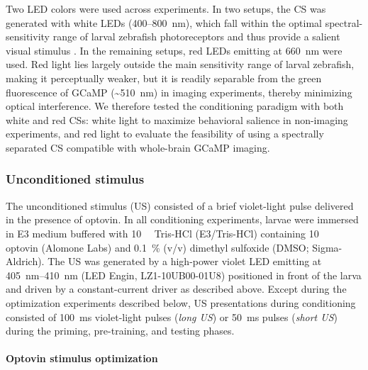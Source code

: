 Two LED colors were used across experiments. In two setups, the CS was generated with white LEDs (400--800~nm), which fall within the optimal spectral-sensitivity range of larval zebrafish photoreceptors and thus provide a salient visual stimulus \citep{Hughes1998}. In the remaining setups, red LEDs emitting at \SI{660}{\nano\meter} were used. Red light lies largely outside the main sensitivity range of larval zebrafish, making it perceptually weaker, but it is readily separable from the green fluorescence of GCaMP (\textasciitilde\SI{510}{\nano\meter}) in imaging experiments, thereby minimizing optical interference. We therefore tested the conditioning paradigm with both white and red CSs: white light to maximize behavioral salience in non-imaging experiments, and red light to evaluate the feasibility of using a spectrally separated CS compatible with whole-brain GCaMP imaging.



\subsubsection{Unconditioned stimulus}

The unconditioned stimulus (US) consisted of a brief violet-light pulse delivered in the presence of optovin. In all conditioning experiments, larvae were immersed in E3 medium buffered with \SI{10}{\milli\Molar} Tris-HCl (E3/Tris-HCl) containing \SI{10}{\micro\Molar} optovin (Alomone Labs) and \SI{0.1}{\percent} (v/v) dimethyl sulfoxide (DMSO; Sigma-Aldrich). The US was generated by a high-power violet LED emitting at \SIrange{405}{410}{\nano\meter} (LED Engin, LZ1-10UB00-01U8) positioned in front of the larva and driven by a constant-current driver as described above. Except during the optimization experiments described below, US presentations during conditioning consisted of \SI{100}{\milli\second} violet-light pulses (\textit{long US}) or \SI{50}{\milli\second} pulses (\textit{short US}) during the priming, pre-training, and testing phases.

\paragraph{Optovin stimulus optimization}

